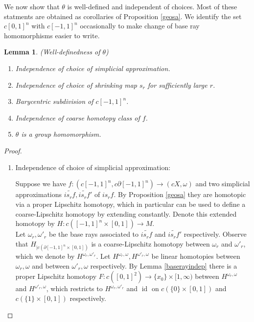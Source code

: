 \documentclass[a4paper,11pt]{article}
\theoremstyle{definition}
\theoremstyle{plain}
\newtheorem{lemma}[definition]{Lemma}
\theoremstyle{remark}
\DeclareMathOperator{\id}{id}
\begin{document}
{We now show that $\theta$ is well-defined and independent of choices. Most of these statments are obtained as corollaries of Proposition \ref{geosa}. We identify the set  $c[0,1]^n$ with $c[-1,1]^n$ occasionally to make change of base ray homomorphisms easier to write.

\begin{lemma} (Well-definedness of $\theta$) \label{indepwelldefined}
\begin{enumerate}
\item Independence of choice of simplicial approximation.
\item Independence of choice of shrinking map $s_{r}$ for sufficiently large $r$.
\item Barycentric subdivision of $c[-1,1]^n$.
\item Independence of coarse homotopy class of $f$.
\item $\theta$ is a group homomorphism. 
\end{enumerate}
\end{lemma}

\begin{proof}

\begin{enumerate}
\item Independence of choice of simplicial approximation:

Suppose we have $f: (c[-1,1]^n,c\partial [-1,1]^n)\rightarrow (cX,\omega)$ and two simplicial approximations $\widetilde{is_{r}f},\widetilde{is_{r}f}'$ of $i s_{r} f$. By Proposition \ref{geosa} they are homotopic via a proper Lipschitz homotopy, which in particular can be used to define a coarse-Lipschitz homotopy by extending constantly. Denote this extended homotopy by $H: c([-1,1]^n \times [0,1])\rightarrow M$.\\

Let $\omega_r, \omega'_r$ be the base rays associated to $\widetilde{is_{r}f}$ and $\widetilde{is_{r}f}'$ respectively. Observe that $H_{|c(\partial[-1,1]^n \times [0,1])}$ is a coarse-Lipschitz homotopy between $\omega_r$ and $\omega'_r$, which we denote by $H^{\omega_{r},\omega'_r}$. Let $H^{\omega_r,\omega},H^{\omega'_{r},\omega}$ be linear homotopies between $\omega_r,\omega$ and between $\omega'_{r},\omega$ respectively. By Lemma \ref{baserayindep} there is a proper Lipschitz homotopy $F: c([0,1]^2)\rightarrow \{x_0\} \times [1,\infty)$ between $H^{\omega_r,\omega}$ and $H^{\omega'_{r},\omega}$, which restricts to $H^{\omega_{r},\omega'_r}$ and $\id$ on $c(\{0\} \times [0,1])$ and $c (\{1\} \times [0,1])$ respectively. \\ 
 

\end{enumerate}
\end{proof}}
\end{document}
